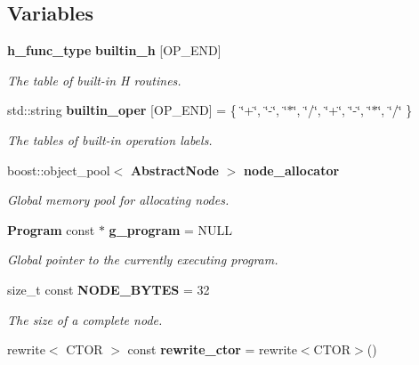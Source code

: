\subsection*{Variables}
\begin{CompactItemize}
\item 
{\bf h\_\-func\_\-type} {\bf builtin\_\-h} [OP\_\-END]
\begin{CompactList}\small\item\em The table of built-in H routines. \item\end{CompactList}\item 
std::string {\bf builtin\_\-oper} [OP\_\-END] = \{ \char`\"{}+\char`\"{}, \char`\"{}-\char`\"{}, \char`\"{}$\ast$\char`\"{}, \char`\"{}/\char`\"{}, \char`\"{}+\char`\"{}, \char`\"{}-\char`\"{}, \char`\"{}$\ast$\char`\"{}, \char`\"{}/\char`\"{} \}\label{namespacesprite_a1}

\begin{CompactList}\small\item\em The tables of built-in operation labels. \item\end{CompactList}\item 
boost::object\_\-pool$<$ {\bf Abstract\-Node} $>$ {\bf node\_\-allocator}\label{namespacesprite_a19}

\begin{CompactList}\small\item\em Global memory pool for allocating nodes. \item\end{CompactList}\item 
{\bf Program} const $\ast$ {\bf g\_\-program} = NULL\label{namespacesprite_a20}

\begin{CompactList}\small\item\em Global pointer to the currently executing program. \item\end{CompactList}\item 
size\_\-t const {\bf NODE\_\-BYTES} = 32
\begin{CompactList}\small\item\em The size of a complete node. \item\end{CompactList}\item 
rewrite$<$ CTOR $>$ const {\bf rewrite\_\-ctor} = rewrite$<$CTOR$>$()\label{namespacesprite_a36}


\end{CompactItemize}
